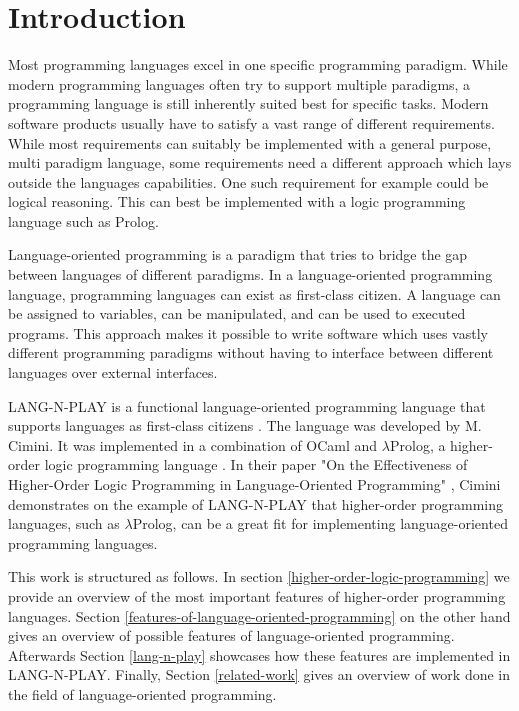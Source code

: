 
\section{Introduction}
\label{introduction}
Most programming languages excel in one specific programming paradigm. While modern programming languages often try to support multiple paradigms, a programming language is still inherently suited best for specific tasks. Modern software products usually have to satisfy a vast range of different requirements. While most requirements can suitably be implemented with a general purpose, multi paradigm language, some requirements need a different approach which lays outside the languages capabilities. One such requirement for example could be logical reasoning. This can best be implemented with a logic programming language such as Prolog. 

Language-oriented programming is a paradigm that tries to bridge the gap between languages of different paradigms. In a language-oriented programming language, programming languages can exist as first-class citizen. A language can be assigned to variables, can be manipulated, and can be used to executed programs. This approach makes it possible to write software which uses vastly different programming paradigms without having to interface between different languages over external interfaces.

LANG-N-PLAY is a functional language-oriented programming language that supports languages as first-class citizens \cite{cimini_effectiveness_2020,cimini_lang-n-play_2018,cimini_languages_2018}. The language was developed by M. Cimini. It was implemented in a combination of OCaml and $\lambda$Prolog, a higher-order logic programming language \cite{miller_programming_2012}. In their paper "On the Effectiveness of Higher-Order Logic Programming in Language-Oriented Programming" \cite{cimini_effectiveness_2020}, Cimini demonstrates on the example of LANG-N-PLAY that higher-order programming languages, such as $\lambda$Prolog, can be a great fit for implementing language-oriented programming languages.

This work is structured as follows. In section \ref{higher-order-logic-programming} we provide an overview of the most important features of higher-order programming languages. Section \ref{features-of-language-oriented-programming} on the other hand gives an overview of possible features of language-oriented programming. Afterwards Section \ref{lang-n-play} showcases how these features are implemented in LANG-N-PLAY. Finally, Section \ref{related-work} gives an overview of work done in the field of language-oriented programming.
